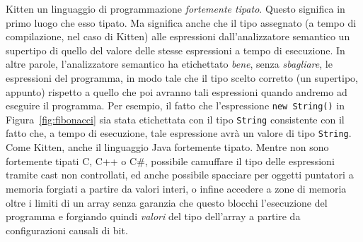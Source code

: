 Kitten \e un linguaggio di programmazione \emph{fortemente tipato}.
Questo significa in primo luogo che esso \e tipato. Ma significa
anche che il tipo assegnato (a tempo di compilazione, nel caso di Kitten)
alle espressioni dall'analizzatore semantico
\e un supertipo di quello del valore delle stesse espressioni a tempo
di esecuzione. In altre parole, l'analizzatore semantico ha etichettato
\emph{bene}, senza \emph{sbagliare},
le espressioni del programma, in modo tale che il tipo scelto
\e corretto (un supertipo, appunto)
rispetto a quello che poi avranno tali espressioni quando andremo ad eseguire
il programma. Per esempio, il fatto che l'espressione \texttt{new String()} in
Figura~\ref{fig:fibonacci} sia stata etichettata con il tipo \texttt{String}
\e consistente con il fatto che, a tempo di esecuzione, tale espressione
avr\`a un valore di tipo \texttt{String}. Come Kitten,
anche il linguaggio Java \e
fortemente tipato. Mentre non sono fortemente tipati C, C++ o C\#, \poiche
\e possibile camuffare il tipo delle espressioni tramite cast non
controllati, ed \e anche possibile spacciare per oggetti puntatori a memoria
forgiati a partire da valori interi, o infine accedere a zone di memoria
oltre i limiti di un array senza garanzia che questo blocchi l'esecuzione
del programma e forgiando quindi \emph{valori} del tipo dell'array
a partire da configurazioni causali di bit.

